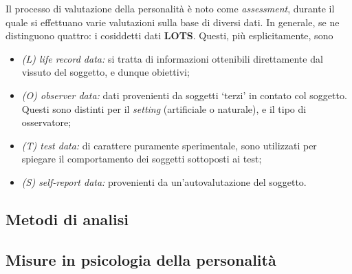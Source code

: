 \documentclass{subfiles}
\begin{document}
Il processo di valutazione della personalità è noto come \emph{assessment}, durante il quale si effettuano varie valutazioni sulla base di diversi dati.
In generale, se ne distinguono quattro: i cosiddetti dati \textbf{LOTS}.
Questi, più esplicitamente, sono
\begin{itemize}
    \item \emph{(L) life record data:} si tratta di informazioni ottenibili direttamente dal vissuto del soggetto, e dunque obiettivi;
    \item \emph{(O) observer data:} dati provenienti da soggetti `terzi' in contato col soggetto.
          Questi sono distinti per il \emph{setting} (artificiale o naturale), e il tipo di osservatore;
    \item \emph{(T) test data:} di carattere puramente sperimentale, sono utilizzati per spiegare il comportamento dei soggetti sottoposti ai test;
    \item \emph{(S) self-report data:} provenienti da un'autovalutazione del soggetto.
\end{itemize}

\subsection{Metodi di analisi}


\subsection{Misure in psicologia della personalità}

\clearpage
\end{document}
